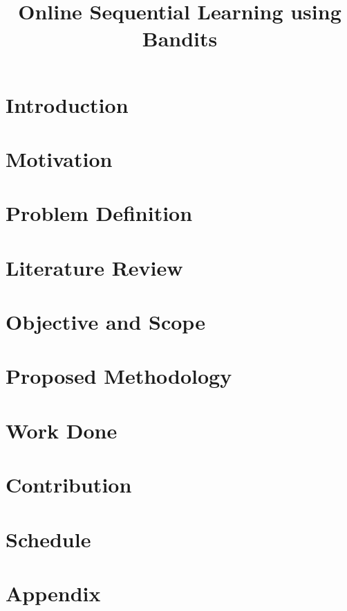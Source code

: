 \documentclass{colt2016} %
\title[Online Sequential Learning using Bandits]{Online Sequential Learning using Bandits}
\begin{document}
\maketitle



\section{Introduction}
\label{intro}


\section{Motivation}
\label{motivation}


\section{Problem Definition}
\label{probDef}


\section{Literature Review}
\label{review}


\section{Objective and Scope}
\label{objective}


\section{Proposed Methodology}
\label{methodology}


\section{Work Done}
\label{workDone}


\section{Contribution}
\label{contribution}


\section{Schedule}
\label{schedule}





\section{Appendix}
\label{appendix}

\end{document}
